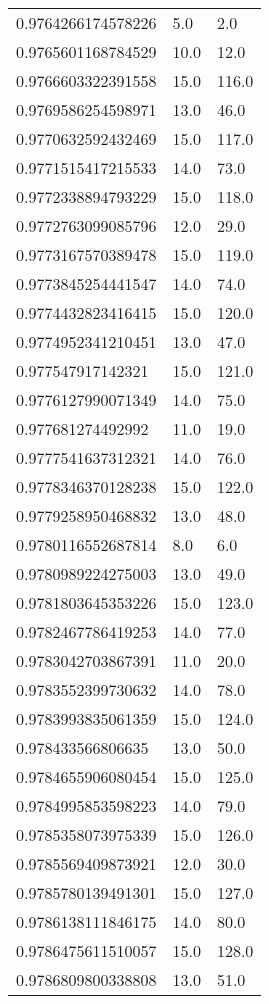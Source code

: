 \begin{center}
\begin{supertabular}[H]{p{0.30\textwidth}p{0.05\textwidth}p{0.05\textwidth}}
0.9764266174578226 & 5.0 & 2.0 \\ 
0.9765601168784529 & 10.0 & 12.0 \\ 
0.9766603322391558 & 15.0 & 116.0 \\ 
0.9769586254598971 & 13.0 & 46.0 \\ 
0.9770632592432469 & 15.0 & 117.0 \\ 
0.9771515417215533 & 14.0 & 73.0 \\ 
0.9772338894793229 & 15.0 & 118.0 \\ 
0.9772763099085796 & 12.0 & 29.0 \\ 
0.9773167570389478 & 15.0 & 119.0 \\ 
0.9773845254441547 & 14.0 & 74.0 \\ 
0.9774432823416415 & 15.0 & 120.0 \\ 
0.9774952341210451 & 13.0 & 47.0 \\ 
0.977547917142321 & 15.0 & 121.0 \\ 
0.9776127990071349 & 14.0 & 75.0 \\ 
0.977681274492992 & 11.0 & 19.0 \\ 
0.9777541637312321 & 14.0 & 76.0 \\ 
0.9778346370128238 & 15.0 & 122.0 \\ 
0.9779258950468832 & 13.0 & 48.0 \\ 
0.9780116552687814 & 8.0 & 6.0 \\ 
0.9780989224275003 & 13.0 & 49.0 \\ 
0.9781803645353226 & 15.0 & 123.0 \\ 
0.9782467786419253 & 14.0 & 77.0 \\ 
0.9783042703867391 & 11.0 & 20.0 \\ 
0.9783552399730632 & 14.0 & 78.0 \\ 
0.9783993835061359 & 15.0 & 124.0 \\ 
0.978433566806635 & 13.0 & 50.0 \\ 
0.9784655906080454 & 15.0 & 125.0 \\ 
0.9784995853598223 & 14.0 & 79.0 \\ 
0.9785358073975339 & 15.0 & 126.0 \\ 
0.9785569409873921 & 12.0 & 30.0 \\ 
0.9785780139491301 & 15.0 & 127.0 \\ 
0.9786138111846175 & 14.0 & 80.0 \\ 
0.9786475611510057 & 15.0 & 128.0 \\ 
0.9786809800338808 & 13.0 & 51.0 \\ 

\end{supertabular}
\end{center}
